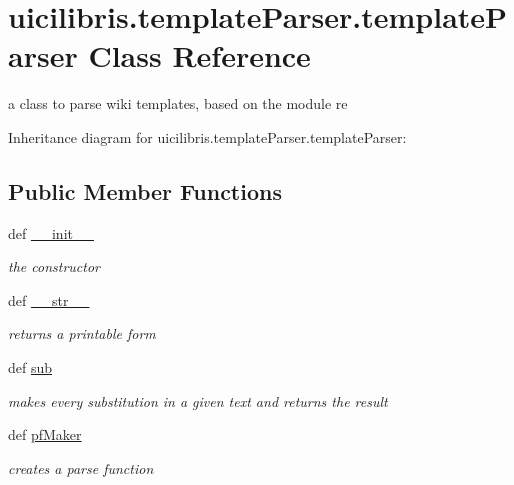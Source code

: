 \hypertarget{classuicilibris_1_1templateParser_1_1templateParser}{\section{uicilibris.\-template\-Parser.\-template\-Parser \-Class \-Reference}
\label{classuicilibris_1_1templateParser_1_1templateParser}
}


a class to parse wiki templates, based on the module re  




\-Inheritance diagram for uicilibris.\-template\-Parser.\-template\-Parser\-:
\subsection*{\-Public \-Member \-Functions}
\begin{DoxyCompactItemize}
\item 
def \hyperlink{classuicilibris_1_1templateParser_1_1templateParser_a7a2e7e96a6c5ebf16de33ca6ae66a170}{\-\_\-\-\_\-init\-\_\-\-\_\-}
\begin{DoxyCompactList}\small\item\em the constructor \end{DoxyCompactList}\item 
def \hyperlink{classuicilibris_1_1templateParser_1_1templateParser_ab8b9373fd6472e55b6478d7a5c505cbf}{\-\_\-\-\_\-str\-\_\-\-\_\-}
\begin{DoxyCompactList}\small\item\em returns a printable form \end{DoxyCompactList}\item 
def \hyperlink{classuicilibris_1_1templateParser_1_1templateParser_a850eb7385e859d86eb7d7467580b8f56}{sub}
\begin{DoxyCompactList}\small\item\em makes every substitution in a given text and returns the result \end{DoxyCompactList}\item 
def \hyperlink{classuicilibris_1_1templateParser_1_1templateParser_a48f677f123127c39f6c84eb3737e2ded}{pf\-Maker}
\begin{DoxyCompactList}\small\item\em creates a parse function \end{DoxyCompactList}\end{DoxyCompactItemize}
